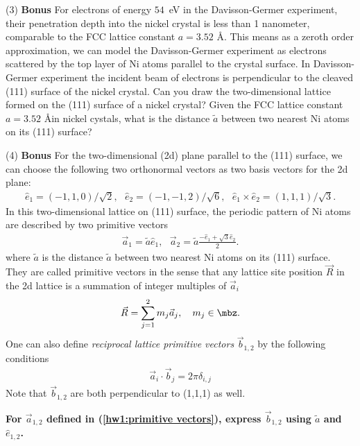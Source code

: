 (3) \textbf{Bonus} For electrons of energy $54$~eV in the Davisson-Germer experiment, their penetration depth into the nickel crystal is less than 1 nanometer, comparable to the FCC lattice constant $a=3.52$ \AA. This means as a zeroth order approximation, we can model the Davisson-Germer experiment as electrons scattered by the top layer of Ni atoms parallel to the crystal surface. In Davisson-Germer experiment the incident beam of electrons is perpendicular to the cleaved (111) surface of the nickel crystal. Can you draw the two-dimensional lattice formed on the (111) surface of a nickel crystal? Given the FCC lattice constant $a=3.52$ \AA in nickel cystals, what is the distance $\tilde a$ between two nearest Ni atoms on its (111) surface?

(4) \textbf{Bonus} For the two-dimensional (2d) plane parallel to the (111) surface, we can choose the following two orthonormal vectors as two basis vectors for the 2d plane:
\begin{align}
\hat e_1=(-1,1,0)/\sqrt2,~~~\hat e_2=(-1,-1,2)/\sqrt6,~~~\hat e_1\times\hat e_2=(1,1,1)/\sqrt3.
\end{align}
In this two-dimensional lattice on (111) surface, the periodic pattern of Ni atoms are described by two primitive vectors 
\begin{align}\label{hw1:primitive vectors}
\vec a_1=\tilde a \hat e_1,~~~\vec a_2=\tilde a\frac{-\hat e_1+\sqrt3\hat e_2}2.
\end{align}
where $\tilde a$ is the distance $\tilde a$ between two nearest Ni atoms on its (111) surface. They are called primitive vectors in the sense that any lattice site position $\vec R$ in the 2d lattice is a summation of integer multiples of $\vec a_i$
\begin{align}
\vec R=\sum_{j=1}^2m_j\vec a_j,~~~m_j\in\mbz.
\end{align}
One can also define \emph{reciprocal lattice primitive vectors} $\vec b_{1,2}$ by the following conditions
\begin{align}
\vec a_i\cdot\vec b_j=2\pi\delta_{i,j}
\end{align}
Note that $\vec b_{1,2}$ are both perpendicular to (1,1,1) as well. 

\textbf{For $\vec a_{1,2}$ defined in (\ref{hw1:primitive vectors}), express $\vec b_{1,2}$ using $\tilde a$ and $\hat e_{1,2}$.}


